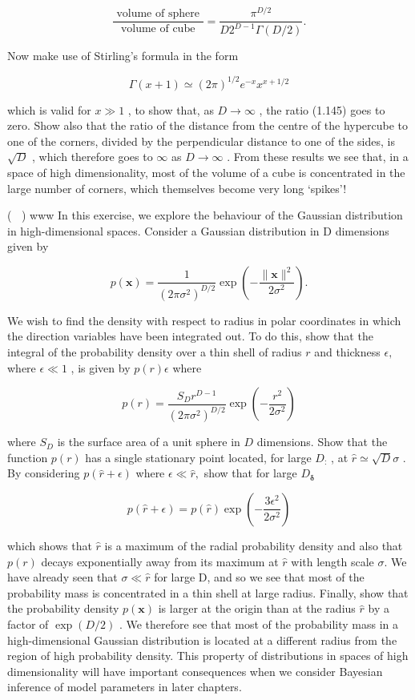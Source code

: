 \documentclass[
  10
]{article}
\begin{document}
\[
\frac {\text { volume   of   sphere }}{\text { volume   of   cube }} = \frac {\pi^ {D / 2}}{D 2 ^ {D - 1} \Gamma (D / 2)}.\tag{1.145}
\]

Now make use of Stirling's formula in the form

\[
\Gamma (x + 1) \simeq (2 \pi) ^ {1 / 2} e ^ {- x} x ^ {x + 1 / 2}\tag{1.146}
\]

which is valid for \(x \gg 1\) , to show that, as \(D \to \infty\) , the
ratio (1.145) goes to zero. Show also that the ratio of the distance
from the centre of the hypercube to one of the corners, divided by the
perpendicular distance to one of the sides, is \(\sqrt { D }\) , which
therefore goes to \(\infty\) as \(D \to \infty\) . From these results we
see that, in a space of high dimensionality, most of the volume of a
cube is concentrated in the large number of corners, which themselves
become very long `spikes'!

( ) www In this exercise, we explore the behaviour of the Gaussian
distribution in high-dimensional spaces. Consider a Gaussian
distribution in D dimensions given by

\[
p (\mathbf {x}) = \frac {1}{(2 \pi \sigma^ {2}) ^ {D / 2}} \exp \left(- \frac {\| \mathbf {x} \| ^ {2}}{2 \sigma^ {2}}\right).\tag{1.147}
\]

We wish to find the density with respect to radius in polar coordinates
in which the direction variables have been integrated out. To do this,
show that the integral of the probability density over a thin shell of
radius \(r\) and thickness \(\epsilon ,\) where \(\epsilon \ll 1\) , is
given by \(p ( r ) \epsilon\) where

\[
p (r) = \frac {S _ {D} r ^ {D - 1}}{(2 \pi \sigma^ {2}) ^ {D / 2}} \exp \left(- \frac {r ^ {2}}{2 \sigma^ {2}}\right)\tag{1.148}
\]

where \(S _ { D }\) is the surface area of a unit sphere in \(D\)
dimensions. Show that the function \(p ( r )\) has a single stationary
point located, for large \(D _ { : }\) , at
\(\widehat { r } \simeq \sqrt { D } \sigma\) . By considering
\(p ( \widehat { r } + \epsilon )\) where
\(\epsilon \ll { \widehat { r } } ,\) show that for large
\(D _ { \mathbf { \delta } }\)

\[
p (\widehat {r} + \epsilon) = p (\widehat {r}) \exp \left(- \frac {3 \epsilon^ {2}}{2 \sigma^ {2}}\right)\tag{1.149}
\]

which shows that \(\widehat { r }\) is a maximum of the radial
probability density and also that \(p ( r )\) decays exponentially away
from its maximum at \(\widehat { r }\) with length scale \(\sigma .\) We
have already seen that \(\sigma \ll \widehat { r }\) for large D, and so
we see that most of the probability mass is concentrated in a thin shell
at large radius. Finally, show that the probability density
\(p ( \mathbf { x } )\) is larger at the origin than at the radius
\(\widehat { r }\) by a factor of \(\exp ( D / 2 )\) . We therefore see
that most of the probability mass in a high-dimensional Gaussian
distribution is located at a different radius from the region of high
probability density. This property of distributions in spaces of high
dimensionality will have important consequences when we consider
Bayesian inference of model parameters in later chapters.
\end{document}
